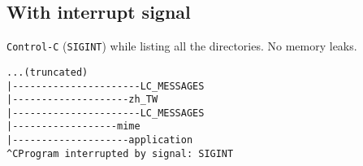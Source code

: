 \documentclass[a4paper]{article}
\begin{document}
\subsection{With interrupt signal}
\texttt{Control-C} (\texttt{SIGINT}) while listing all the directories. No memory leaks.


\begin{verbatim}
...(truncated)
|----------------------LC_MESSAGES
|--------------------zh_TW
|----------------------LC_MESSAGES
|------------------mime
|--------------------application
^CProgram interrupted by signal: SIGINT
\end{verbatim}
\end{document}

